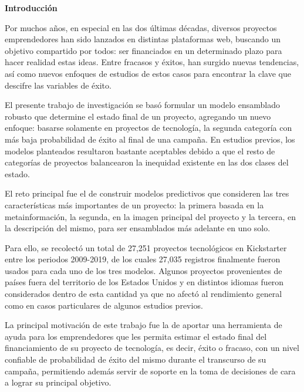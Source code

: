 \thispagestyle{plain}
\begin{center}
	{\Large \bfseries  Introducción}
\end{center}
\vspace{0.5cm}

Por muchos años, en especial en las dos últimas décadas, diversos proyectos emprendedores han sido lanzados en distintas plataformas web, buscando un objetivo compartido por todos: ser financiados en un determinado plazo para hacer realidad estas ideas. Entre fracasos y éxitos, han surgido nuevas tendencias, así como nuevos enfoques de estudios de estos casos para encontrar la clave que descifre las variables de éxito.

El presente trabajo de investigación se basó formular un modelo ensamblado robusto que determine el estado final de un proyecto, agregando un nuevo enfoque: basarse solamente en proyectos de tecnología, la segunda categoría con más baja probabilidad de éxito al final de una campaña. En estudios previos, los modelos planteados resultaron bastante aceptables debido a que el resto de categorías de proyectos balancearon la inequidad existente en las dos clases del estado.

El reto principal fue el de construir modelos predictivos que consideren las tres características más importantes de un proyecto: la primera basada en la metainformación, la segunda, en la imagen principal del proyecto y la tercera, en la descripción del mismo, para ser ensamblados más adelante en uno solo.

Para ello, se recolectó un total de 27,251 proyectos tecnológicos en Kickstarter entre los periodos 2009-2019, de los cuales 27,035 registros finalmente fueron usados para cada uno de los tres modelos. Algunos proyectos provenientes de países fuera del territorio de los Estados Unidos y en distintos idiomas fueron considerados dentro de esta cantidad ya que no afectó al rendimiento general como en casos particulares de algunos estudios previos.

La principal motivación de este trabajo fue la de aportar una herramienta de ayuda para los emprendedores que les permita estimar el estado final del financiamiento de su proyecto de tecnología, es decir, éxito o fracaso, con un nivel confiable de probabilidad de éxito del mismo durante el transcurso de su campaña, permitiendo además servir de soporte en la toma de decisiones de cara a lograr su principal objetivo.